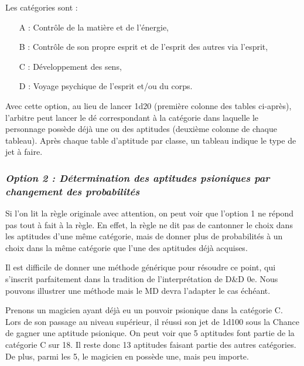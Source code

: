 \bigskip

Les catégories sont :

\bigskip

\begin{itemize}
\item[A :] Contrôle de la matière et de l'énergie,
\item[B :] Contrôle de son propre esprit et de l'esprit des autres via l'esprit,
\item[C :] Développement des sens,
\item[D :] Voyage psychique de l'esprit et/ou du corps.
\end{itemize}

\bigskip

Avec cette option, au lieu de lancer 1d20 (première colonne des tables ci-après), l'arbitre peut lancer le dé correspondant à la catégorie dans laquelle le personnage possède déjà une ou des aptitudes (deuxième colonne de chaque tableau). Après chaque table d'aptitude par classe, un tableau indique le type de jet à faire.

\subsubsection*{\textit{Option 2 : Détermination des aptitudes psioniques par changement des probabilités}}

Si l'on lit la règle originale avec attention, on peut voir que l'option 1 ne répond pas tout à fait à la règle. En effet, la règle ne dit pas de cantonner le choix dans les aptitudes d'une même catégorie, mais de donner plus de probabilités à un choix dans la même catégorie que l'une des aptitudes déjà acquises.

\bigskip

Il est difficile de donner une méthode générique pour résoudre ce point, qui s'inscrit parfaitement dans la tradition de l'interprétation de D\&D 0e. Nous pouvons illustrer une méthode mais le MD devra l'adapter le cas échéant.

\bigskip

Prenons un magicien ayant déjà eu un pouvoir psionique dans la catégorie C. Lors de son passage au niveau supérieur, il réussi son jet de 1d100 sous la Chance de gagner une aptitude psionique. On peut voir que 5 aptitudes font partie de la catégorie C sur 18. Il reste donc 13 aptitudes faisant partie des autres catégories. De plus, parmi les 5, le magicien en possède une, mais peu importe.

